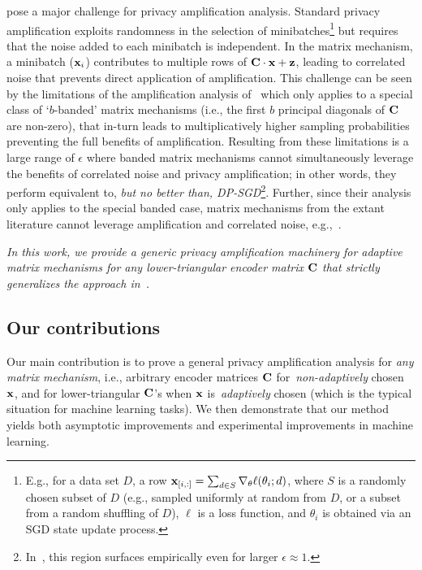 \mms pose a major challenge for privacy amplification analysis. Standard privacy amplification exploits randomness in the selection of minibatches\footnote{E.g., for a data set $D$, a row $\mathbf{x}_{[i,:]}=\sum_{d\in S}\nabla_\theta \ell(\theta_i;d)$, where $S$ is a randomly chosen subset of $D$ (e.g., sampled uniformly at random from $D$, or a subset from a random shuffling of $D$), $\ell$ is a loss function, and $\theta_i$ is obtained via an SGD state update process.} but requires that the noise added to each minibatch is independent. In the matrix mechanism, a minibatch ($\mathbf{x}_i$) contributes to multiple rows of $\mathbf{C}\cdot\mathbf{x} + \mathbf{z}$, leading to correlated noise that prevents direct application of amplification. This challenge can be seen by the limitations of the amplification analysis of~\citet{BandedMF} which only applies to a special class of `$b$-banded' matrix mechanisms (i.e., the first $b$ principal diagonals of $\mathbf{C}$ are non-zero), that in-turn leads to multiplicatively higher sampling probabilities
preventing the full benefits of amplification.
Resulting from these limitations is a large range of $\epsilon$ where banded matrix mechanisms cannot simultaneously leverage the benefits of correlated noise and privacy amplification; in other words, they perform equivalent to, \textit{but no better than, DP-SGD}\footnote{In~\citet{BandedMF}, this region surfaces empirically even for larger $\epsilon\approx1$.}.  Further, since their analysis only applies to the special banded case, matrix mechanisms from the extant literature cannot leverage amplification and correlated noise, e.g.,~\cite{kairouz2021practical,MEMF,denisovDPMF}. 

\begin{center}
\textit{In this work, we provide a generic privacy amplification machinery for adaptive matrix mechanisms for any lower-triangular encoder matrix $\mathbf{C}$ that strictly generalizes the approach in~\citep{BandedMF}.}
\end{center}
%
\vspace{-1.5em}  %
\subsection{Our contributions}
\vspace{-0.25em}  %
Our main contribution is to prove a general privacy amplification analysis for \textit{any matrix mechanism}, i.e., arbitrary encoder matrices $\mathbf{C}$ for~\emph{non-adaptively} chosen $\mathbf{x}$, and for lower-triangular $\mathbf{C}$'s when $\mathbf{x}$ is~\emph{adaptively} chosen (which is the typical situation for machine learning tasks).  We then demonstrate that our method yields both asymptotic improvements and experimental improvements in machine learning.

